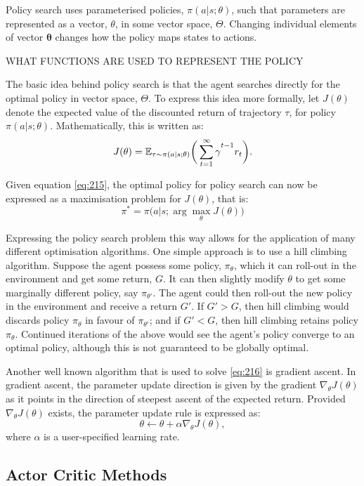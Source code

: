 Policy search uses parameterised policies, $\pi(a | s;\theta)$, such that parameters are represented as a vector, $\theta$, in some vector space, $\Theta$. Changing individual elements of vector $\mathbf{\theta}$ changes how the policy maps states to actions.

WHAT FUNCTIONS ARE USED TO REPRESENT THE POLICY

The basic idea behind policy search is that the agent searches directly for the optimal policy in vector space, $\Theta$. To express this idea more formally, let $J(\theta)$ denote the expected value of the discounted return of trajectory $\tau$, for policy $\pi(a|s;\theta)$. Mathematically, this is written as:
\begin{equation}
	J(\theta) = \mathbb{E}_{\tau \sim \pi(a|s;\theta)} \bigg( \sum_{t=1}^{\infty} \gamma\mystrut^{t-1} r_t \bigg). \label{eq:215}
\end{equation}

Given equation \ref{eq:215}, the optimal policy for policy search can now be expressed as a maximisation problem  for $J(\theta)$, that is: 
\begin{equation}
	\pi^* = \pi\big(a|s;\arg\max_{\theta} J(\theta)\big) \label{eq:216}
\end{equation}

Expressing the policy search problem this way allows for the application of many different optimisation algorithms. One simple approach is to use a hill climbing algorithm. Suppose the agent possess some policy, $\pi_{\theta}$, which it can roll-out in the environment and get some return, $G$. It can then slightly modify $\theta$ to get some marginally different policy, say $\pi_{\theta'}$. The agent could then roll-out the new policy in the environment and receive a return $G'$. If $G' > G$, then hill climbing would discards policy $\pi_{\theta}$ in favour of $\pi_{\theta'}$; and if $G' < G$, then hill climbing retains policy $\pi_{\theta}$. Continued iterations of the above would see the agent's policy converge to an optimal policy, although this is not guaranteed to be globally optimal.

Another well known algorithm that is used to solve \ref{eq:216} is gradient ascent. In gradient ascent, the parameter update direction is given by the gradient $\nabla_{\theta} J(\theta)$ as it points in the direction of steepest ascent of the expected return. Provided $\nabla_{\theta} J(\theta)$ exists, the parameter update rule is expressed as:
\begin{equation}
	\theta \gets \theta + \alpha \nabla_{\theta}J(\theta),
\end{equation}
where $\alpha$ is a user-specified learning rate.



\subsection{Actor Critic Methods}
